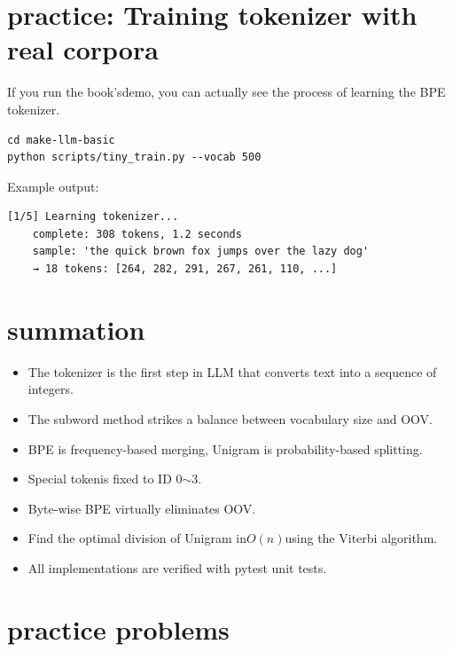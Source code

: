 \section{practice: Training tokenizer with real corpora}

If you run the book'sdemo, you can actually see the process of learning the BPE tokenizer.

\begin{lstlisting}[style=bashstyle]
cd make-llm-basic
python scripts/tiny_train.py --vocab 500
\end{lstlisting}

Example output:
\begin{lstlisting}[basicstyle=\ttfamily\footnotesize, backgroundcolor=\color{codebg}, frame=single]
[1/5] Learning tokenizer...
    complete: 308 tokens, 1.2 seconds
    sample: 'the quick brown fox jumps over the lazy dog'
    → 18 tokens: [264, 282, 291, 267, 261, 110, ...]
\end{lstlisting}

\section{summation}

\begin{itemize}
\item The tokenizer is the first step in LLM that converts text into a sequence of integers.
\item The subword method strikes a balance between vocabulary size and OOV.
\item BPE is frequency-based merging, Unigram is probability-based splitting.
\item Special tokenis fixed to ID 0$\sim$3.
\item Byte-wise BPE virtually eliminates OOV.
\item Find the optimal division of Unigram in$O(n)$using the Viterbi algorithm.
\item All implementations are verified with pytest unit tests.
\end{itemize}

\section{practice problems}

